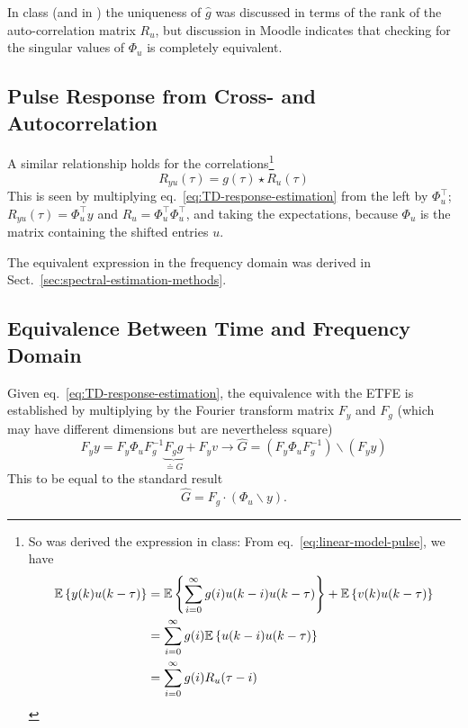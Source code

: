 In class (and in \cite[Sect.~13.2]{ljung}) the uniqueness of $\hat{g}$ was discussed in terms of the rank of the auto-correlation matrix $R_u$, but discussion in Moodle indicates that checking for the singular values of $\Phi_u$ is completely equivalent.


\subsection{Pulse Response from Cross- and Autocorrelation}
\label{sec:}

A similar relationship holds for the correlations\footnote{So was derived the expression in class: From eq.~\eqref{eq:linear-model-pulse}, we have
  \begin{align*}
    \mathbb{E}\left\{y(k)u(k-\tau)\right\} &= \mathbb{E}\left\{\sum_{i=0}^\infty g(i)u(k-i)u(k-\tau)\right\} + \mathbb{E}\left\{v(k)u(k-\tau)\right\} \\
                       &= \sum_{i=0}^\infty g(i) \mathbb{E}\left\{u(k-i)u(k-\tau)\right\} \\
                       &= \sum_{i=0}^\infty g(i) R_u(\tau-i)
  \end{align*}
}
\begin{equation*}
  R_{yu}(\tau) = g(\tau) \star R_u(\tau)
\end{equation*}
This is seen by multiplying eq.~\eqref{eq:TD-response-estimation} from the left by $\Phi_u^\top$; $R_{yu}(\tau) = \Phi_u^\top y$ and $R_u =\Phi_u^\top \Phi_u^\top$, and taking the expectations, because $\Phi_u$ is the matrix containing the shifted entries $u$.

The equivalent expression in the frequency domain was derived in Sect.~\ref{sec:spectral-estimation-methods}.

\iffalse
\subsection{Equivalence Between Time and Frequency Domain}
\label{sec:equivalence-time-freq-domain}

Given eq.~\eqref{eq:TD-response-estimation}, the equivalence with the ETFE is established by multiplying by the Fourier transform matrix $F_y$ and $F_g$ (which may have different dimensions but are nevertheless square)
\begin{equation*}
  F_yy = F_y\Phi_uF_g^{-1}\underbrace{F_gg}_{\doteq G} + F_yv \longrightarrow \hat{G} = \left(F_y\Phi_uF_g^{-1}\right) \backslash \left(F_yy\right)
\end{equation*}
This to be equal to the standard result
\begin{equation*}
\hat{G} = F_g\cdot (\Phi_u \backslash y).
\end{equation*}


